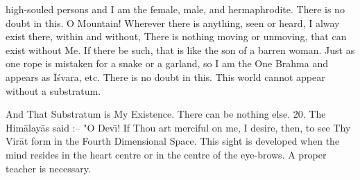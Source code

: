 high-souled persons and I am the female, male, and hermaphrodite. There is no doubt in this. O Mountain! Wherever there is anything, seen or heard, I alway exist there, within and without, There is nothing moving or unmoving, that can exist without Me. If there be such, that is like the son of a barren woman. Just as one rope is mistaken for a snake or a garland, so I am the One Brahma and appears as \=I\'svara, etc. There is no doubt in this. This world cannot appear without a substratum.

And That Substratum is My Existence. There can be nothing else.
20. The Him\=alay\=as said :-- "O Dev\={\i}! If Thou art merciful on me, I desire, then, to see Thy Vir\=at form in the Fourth Dimensional Space.
This sight is developed when the mind resides in the heart centre or in the centre of the eye-brows. A proper teacher is necessary.
